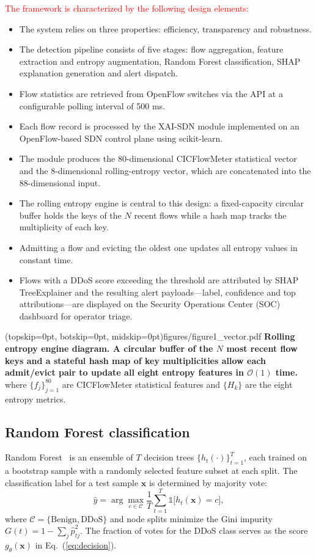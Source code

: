 \documentclass{ieeeaccess}
\begin{document}
\textcolor{red}{The framework is characterized by the following design elements:}
\begin{itemize}
\item The system relies on three properties: efficiency, transparency and robustness.
\item The detection pipeline consists of five stages: flow aggregation, feature extraction and entropy augmentation, Random Forest classification, SHAP explanation generation and alert dispatch.
\item Flow statistics are retrieved from OpenFlow switches via the API at a configurable polling interval of 500 ms.
\item Each flow record is processed by the XAI-SDN module implemented on an OpenFlow-based SDN control plane using scikit-learn.
\item The module produces the 80-dimensional CICFlowMeter statistical vector and the 8-dimensional rolling-entropy vector, which are concatenated into the 88-dimensional input.
\item The rolling entropy engine is central to this design: a fixed-capacity circular buffer holds the keys of the $N$ recent flows while a hash map tracks the multiplicity of each key.
\item Admitting a flow and evicting the oldest one updates all entropy values in constant time.
\item Flows with a DDoS score exceeding the threshold are attributed by SHAP TreeExplainer and the resulting alert payloads---label, confidence and top attributions---are displayed on the Security Operations Center (SOC) dashboard for operator triage.
\end{itemize}

\Figure[t!](topskip=0pt, botskip=0pt, midskip=0pt){figures/figure1_vector.pdf}
{ \textbf{Rolling entropy engine diagram. A circular buffer of the $N$ most recent flow keys and a stateful hash map of key multiplicities allow each admit/evict pair to update all eight entropy features in $\mathcal{O}(1)$ time.}\label{fig:entropyengine}}
where $\{f_j\}_{j=1}^{80}$ are CICFlowMeter statistical features and $\{H_k\}$ are the eight entropy metrics.

\subsection{Random Forest classification}
Random Forest~\cite{breiman2001rf} is an ensemble of $T$ decision trees $\{h_t(\cdot)\}_{t=1}^{T}$, each trained on a bootstrap sample with a randomly selected feature subset at each split. The classification label for a test sample $\mathbf{x}$ is determined by majority vote:
\begin{equation}
\hat{y} = \arg\max_{c \in \mathcal{C}} \frac{1}{T} \sum_{t=1}^{T} \mathbb{1}\bigl[h_t(\mathbf{x}) = c\bigr],
\label{eq:rfpred}
\end{equation}
where $\mathcal{C} = \{\text{Benign}, \text{DDoS}\}$ and node splits minimize the Gini impurity $G(t) = 1 - \sum_{j} \hat{p}_{tj}^{2}$. The fraction of votes for the DDoS class serves as the score $g_{\theta}(\mathbf{x})$ in Eq.~(\ref{eq:decision}).
\end{document}
